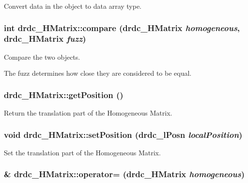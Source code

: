 Convert data in the object to data array type. 

\hypertarget{classdrdc__HMatrix_5e948bc0daf09f8fd9e780683303b995}{
\subsubsection[compare]{\setlength{\rightskip}{0pt plus 5cm}int drdc\_\-HMatrix::compare ({\bf drdc\_\-HMatrix} {\em homogeneous}, \/  {\bf drdc\_\-HMatrix} {\em fuzz})}}
\label{classdrdc__HMatrix_5e948bc0daf09f8fd9e780683303b995}


Compare the two objects. 

The fuzz determines how close they are considered to be equal. \hypertarget{classdrdc__HMatrix_2e28d6ec867b30ca11e5054fe2854cc1}{
\subsubsection[getPosition]{ drdc\_\-HMatrix::getPosition ()}}
\label{classdrdc__HMatrix_2e28d6ec867b30ca11e5054fe2854cc1}


Return the translation part of the Homogeneous Matrix. 

\hypertarget{classdrdc__HMatrix_1a7c2f6cb34255c88a40c832a96e5fb3}{
\subsubsection[setPosition]{\setlength{\rightskip}{0pt plus 5cm}void drdc\_\-HMatrix::setPosition ({\bf drdc\_\-lPosn} {\em localPosition})}}
\label{classdrdc__HMatrix_1a7c2f6cb34255c88a40c832a96e5fb3}


Set the translation part of the Homogeneous Matrix. 

\hypertarget{classdrdc__HMatrix_9b19afd1fb7b7fb2f6540c829272f675}{
\subsubsection[operator=]{\& drdc\_\-HMatrix::operator= ({\bf drdc\_\-HMatrix} {\em homogeneous})}}
\label{classdrdc__HMatrix_9b19afd1fb7b7fb2f6540c829272f675}


